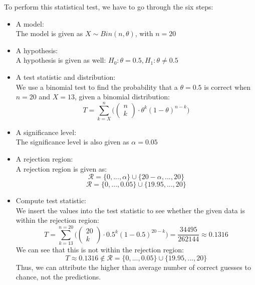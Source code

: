 To perform this statistical test, we have to go through the six steps:
\begin{itemize}
\item A model: \\
The model is given as $X \sim Bin(n,\theta)$, with $n = 20$
\item A hypothesis: \\
A hypothesis is given as well: $H_0: \theta = 0.5, H_1: \theta \neq 0.5$
\item A test statistic and distribution: \\
We use a binomial test to find the probability that a $\theta = 0.5$ is correct when $n = 20$ and $X = 13$, given a binomial distribution:
$$
T = \sum_{k = X}^{n} \Bigg( \begin{pmatrix} n \\ k \end{pmatrix} \cdot \theta^k (1-\theta)^{n-k}\Bigg)
$$
\item A significance level: \\
The significance level is also given as $\alpha = 0.05$
\item A rejection region: \\
A rejection region is given as:
$$
\mathcal{R}=\{0,...,\alpha\}\cup\{20-\alpha,...,20\}
$$
$$
\mathcal{R} = \{0,...,0.05\} \cup \{19.95,...,20\}
$$
\item Compute test statistic: \\
We insert the values into the test statistic to see whether the given data is within the rejection region:
$$
T = \sum_{k = 13}^{n=20} \Bigg( \begin{pmatrix} 20 \\ k \end{pmatrix} \cdot 0.5^k (1-0.5)^{20-k}\Bigg) = \frac{34495}{262144} \approx 0.1316
$$
We can see that this is not within the rejection region:
$$
T \approx 0.1316 \not\in \mathcal{R} = \{0,...,0.05\} \cup \{19.95,...,20\}
$$
Thus, we can attribute the higher than average number of correct guesses to chance, not the predictions.
\end{itemize}